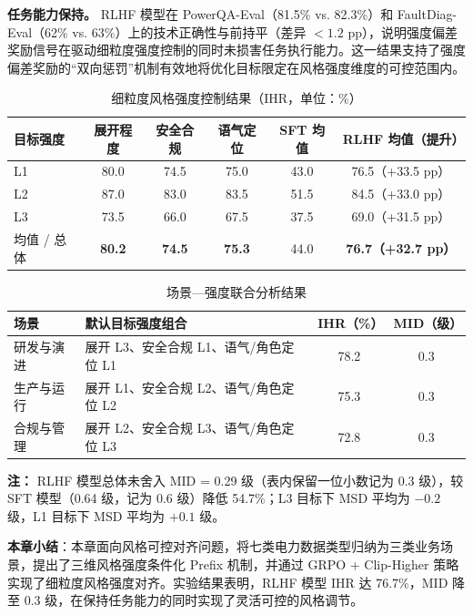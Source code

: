 \documentclass[fontset=fandol,type=master,campus=shenzhen,etitleauto=true]{hithesisbook}
\begin{document}
\textbf{任务能力保持。} RLHF 模型在 PowerQA-Eval（81.5\% vs. 82.3\%）和 FaultDiag-Eval（62\% vs. 63\%）上的技术正确性与前持平（差异 $<1.2$ pp），说明强度偏差奖励信号在驱动细粒度强度控制的同时未损害任务执行能力。这一结果支持了强度偏差奖励的``双向惩罚''机制有效地将优化目标限定在风格强度维度的可控范围内。

\begin{table}[htbp]
\centering
\caption{细粒度风格强度控制结果（IHR，单位：\%）}
\label{tab:intensity-results}
\small
\setlength{\tabcolsep}{6pt}
\renewcommand{\arraystretch}{1.15}
\begin{tabular}{l c c c c c}
\toprule
\textbf{目标强度} & \textbf{展开程度} & \textbf{安全合规} & \textbf{语气定位} & \textbf{SFT 均值} & \textbf{RLHF 均值（提升）} \\
\midrule
L1 & 80.0 & 74.5 & 75.0 & 43.0 & 76.5（+33.5 pp） \\
L2 & 87.0 & 83.0 & 83.5 & 51.5 & 84.5（+33.0 pp） \\
L3 & 73.5 & 66.0 & 67.5 & 37.5 & 69.0（+31.5 pp） \\
\midrule
均值 / 总体 & \textbf{80.2} & \textbf{74.5} & \textbf{75.3} & 44.0 & \textbf{76.7（+32.7 pp）} \\
\bottomrule
\end{tabular}
\end{table}

\begin{table}[htbp]
\centering
\caption{场景---强度联合分析结果}
\label{tab:scene-intensity-results}
\small
\renewcommand{\arraystretch}{1.15}
\begin{tabular}{l l c c}
\toprule
\textbf{场景} & \textbf{默认目标强度组合} & \textbf{IHR（\%）} & \textbf{MID（级）} \\
\midrule
研发与演进 & 展开 L3、安全合规 L1、语气/角色定位 L1 & 78.2 & 0.3 \\
生产与运行 & 展开 L1、安全合规 L2、语气/角色定位 L2 & 75.3 & 0.3 \\
合规与管理 & 展开 L2、安全合规 L3、语气/角色定位 L3 & 72.8 & 0.3 \\
\bottomrule
\end{tabular}

\vspace{0.2cm}
{\small \textbf{注：} RLHF 模型总体未舍入 MID = 0.29 级（表内保留一位小数记为 0.3 级），较 SFT 模型（0.64 级，记为 0.6 级）降低 54.7\%；L3 目标下 MSD 平均为 $-0.2$ 级，L1 目标下 MSD 平均为 $+0.1$ 级。}
\end{table}

\vspace{0.5cm}
\noindent \textbf{本章小结}：本章面向风格可控对齐问题，将七类电力数据类型归纳为三类业务场景，提出了三维风格强度条件化 Prefix 机制，并通过 GRPO + Clip-Higher 策略实现了细粒度风格强度对齐。实验结果表明，RLHF 模型 IHR 达 76.7\%，MID 降至 0.3 级，在保持任务能力的同时实现了灵活可控的风格调节。
\end{document}
